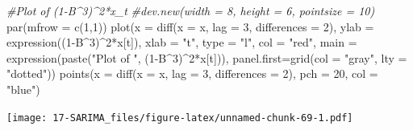 \documentclass[
]{book}
\newenvironment{Shaded}{\begin{snugshade}}{\end{snugshade}}
\newcommand{\AttributeTok}[1]{\textcolor[rgb]{0.77,0.63,0.00}{#1}}
\newcommand{\CommentTok}[1]{\textcolor[rgb]{0.56,0.35,0.01}{\textit{#1}}}
\newcommand{\DecValTok}[1]{\textcolor[rgb]{0.00,0.00,0.81}{#1}}
\newcommand{\FunctionTok}[1]{\textcolor[rgb]{0.00,0.00,0.00}{#1}}
\newcommand{\NormalTok}[1]{#1}
\newcommand{\SpecialCharTok}[1]{\textcolor[rgb]{0.00,0.00,0.00}{#1}}
\newcommand{\StringTok}[1]{\textcolor[rgb]{0.31,0.60,0.02}{#1}}
\theoremstyle{definition}
\theoremstyle{definition}
\theoremstyle{definition}
\theoremstyle{definition}
\theoremstyle{remark}
\begin{document}
\begin{Shaded}
\begin{Highlighting}[]
\CommentTok{\#Plot of (1{-}B\^{}3)\^{}2*x\_t }
  \CommentTok{\#dev.new(width = 8, height = 6, pointsize = 10)}
  \FunctionTok{par}\NormalTok{(}\AttributeTok{mfrow =} \FunctionTok{c}\NormalTok{(}\DecValTok{1}\NormalTok{,}\DecValTok{1}\NormalTok{))}
  \FunctionTok{plot}\NormalTok{(}\AttributeTok{x =} \FunctionTok{diff}\NormalTok{(}\AttributeTok{x =}\NormalTok{ x, }\AttributeTok{lag =} \DecValTok{3}\NormalTok{, }\AttributeTok{differences =} \DecValTok{2}\NormalTok{), }\AttributeTok{ylab =} \FunctionTok{expression}\NormalTok{((}\DecValTok{1}\SpecialCharTok{{-}}\NormalTok{B}\SpecialCharTok{\^{}}\DecValTok{3}\NormalTok{)}\SpecialCharTok{\^{}}\DecValTok{2}\SpecialCharTok{*}\NormalTok{x[t]), }\AttributeTok{xlab =} \StringTok{"t"}\NormalTok{, }\AttributeTok{type =} \StringTok{"l"}\NormalTok{, }\AttributeTok{col =} \StringTok{"red"}\NormalTok{,  }
        \AttributeTok{main =}  \FunctionTok{expression}\NormalTok{(}\FunctionTok{paste}\NormalTok{(}\StringTok{"Plot of "}\NormalTok{, (}\DecValTok{1}\SpecialCharTok{{-}}\NormalTok{B}\SpecialCharTok{\^{}}\DecValTok{3}\NormalTok{)}\SpecialCharTok{\^{}}\DecValTok{2}\SpecialCharTok{*}\NormalTok{x[t])), }\AttributeTok{panel.first=}\FunctionTok{grid}\NormalTok{(}\AttributeTok{col =} \StringTok{"gray"}\NormalTok{, }\AttributeTok{lty =} \StringTok{"dotted"}\NormalTok{))}
  \FunctionTok{points}\NormalTok{(}\AttributeTok{x =} \FunctionTok{diff}\NormalTok{(}\AttributeTok{x =}\NormalTok{ x, }\AttributeTok{lag =} \DecValTok{3}\NormalTok{, }\AttributeTok{differences =} \DecValTok{2}\NormalTok{), }\AttributeTok{pch =} \DecValTok{20}\NormalTok{, }\AttributeTok{col =} \StringTok{"blue"}\NormalTok{)}
\end{Highlighting}
\end{Shaded}

\texttt{[image: 17-SARIMA\_files/figure-latex/unnamed-chunk-69-1.pdf]}
\end{document}
